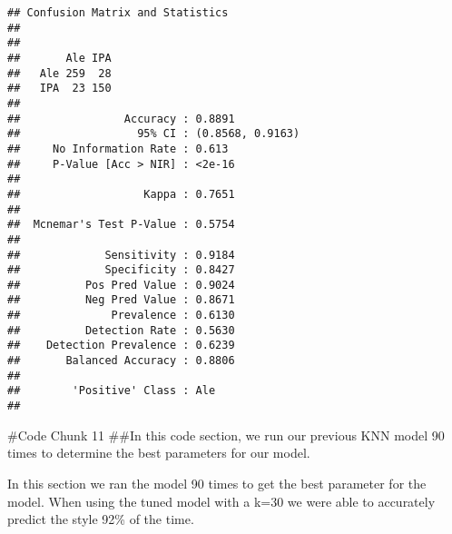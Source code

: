 \documentclass[
]{article}
\begin{document}
\begin{verbatim}
## Confusion Matrix and Statistics
## 
##      
##       Ale IPA
##   Ale 259  28
##   IPA  23 150
##                                           
##                Accuracy : 0.8891          
##                  95% CI : (0.8568, 0.9163)
##     No Information Rate : 0.613           
##     P-Value [Acc > NIR] : <2e-16          
##                                           
##                   Kappa : 0.7651          
##                                           
##  Mcnemar's Test P-Value : 0.5754          
##                                           
##             Sensitivity : 0.9184          
##             Specificity : 0.8427          
##          Pos Pred Value : 0.9024          
##          Neg Pred Value : 0.8671          
##              Prevalence : 0.6130          
##          Detection Rate : 0.5630          
##    Detection Prevalence : 0.6239          
##       Balanced Accuracy : 0.8806          
##                                           
##        'Positive' Class : Ale             
## 
\end{verbatim}

\#Code Chunk 11 \#\#In this code section, we run our previous KNN model
90 times to determine the best parameters for our model.

In this section we ran the model 90 times to get the best parameter for
the model. When using the tuned model with a k=30 we were able to
accurately predict the style 92\% of the time.
\end{document}
